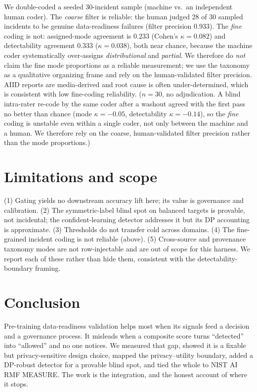 \documentclass[11pt]{article}
\begin{document}
We double-coded a seeded 30-incident sample (machine vs.\ an independent human
coder). The \emph{coarse} filter is reliable: the human judged 28 of 30 sampled
incidents to be genuine data-readiness failures (filter precision $0.933$). The
\emph{fine} coding is not: assigned-mode agreement is $0.233$ (Cohen's
$\kappa=0.082$) and detectability agreement $0.333$ ($\kappa=0.038$), both near
chance, because the machine coder systematically over-assigns \emph{distributional}
and \emph{partial}. We therefore do \emph{not} claim the fine mode proportions as a
reliable measurement; we use the taxonomy as a qualitative organizing frame and
rely on the human-validated filter precision. AIID reports are media-derived and
root cause is often under-determined, which is consistent with low fine-coding
reliability. ($n{=}30$, no adjudication. A blind intra-rater re-code by the same
coder after a washout agreed with the first pass no better than chance (mode
$\kappa{=}{-}0.05$, detectability $\kappa{=}{-}0.14$), so the \emph{fine} coding is
unstable even within a single coder, not only between the machine and a human. We
therefore rely on the coarse, human-validated filter precision rather than the mode
proportions.)

\section{Limitations and scope}

(1) Gating yields no downstream accuracy lift here; its value is governance and
calibration. (2) The symmetric-label blind spot on balanced targets is provable,
not incidental; the confident-learning detector addresses it but its DP accounting
is approximate. (3) Thresholds do not transfer cold across domains. (4) The
fine-grained incident coding is not reliable (above). (5) Cross-source and
provenance taxonomy modes are not row-injectable and are out of scope for this
harness. We report each of these rather than hide them, consistent with the
detectability-boundary framing.

\section{Conclusion}

Pre-training data-readiness validation helps most when its signals feed a decision
and a governance process. It misleads when a composite score turns ``detected''
into ``allowed'' and no one notices. We measured that gap, showed it is a fixable
but privacy-sensitive design choice, mapped the privacy--utility boundary, added a
DP-robust detector for a provable blind spot, and tied the whole to NIST AI RMF
MEASURE. The work is the integration, and the honest account of where it stops.
\end{document}
